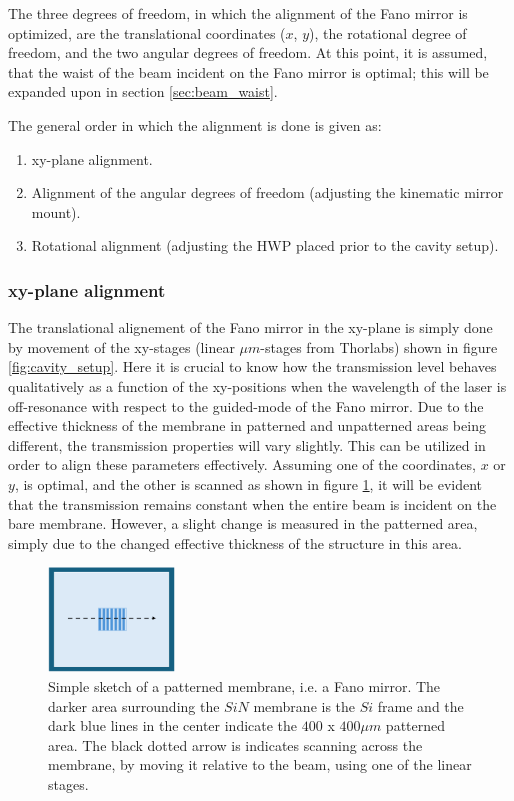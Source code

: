The three degrees of freedom, in which the alignment of the Fano mirror is optimized, are the translational coordinates ($x$, $y$), the rotational degree of freedom, and the two angular degrees of freedom. At this point, it is assumed, that the waist of the beam incident on the Fano mirror is optimal; this will be expanded upon in section \ref{sec:beam_waist}.

The general order in which the alignment is done is given as:
\begin{enumerate}
    \item xy-plane alignment. 
    \item Alignment of the angular degrees of freedom (adjusting the kinematic mirror mount).
    \item Rotational alignment (adjusting the HWP placed prior to the cavity setup).
\end{enumerate}

\subsubsection*{xy-plane alignment}
The translational alignement of the Fano mirror in the xy-plane is simply done by movement of the xy-stages (linear $\mu m$-stages from Thorlabs) shown in figure \ref{fig:cavity_setup}. Here it is crucial to know how the transmission level behaves qualitatively as a function of the xy-positions when the wavelength of the laser is off-resonance with respect to the guided-mode of the Fano mirror. Due to the effective thickness of the membrane in patterned and unpatterned areas being different, the transmission properties will vary slightly. This can be utilized in order to align these parameters effectively. Assuming one of the coordinates, $x$ or $y$, is optimal, and the other is scanned as shown in figure \ref{fig:xy_alignment_sketch}, it will be evident that the transmission remains constant when the entire beam is incident on the bare membrane. However, a slight change is measured in the patterned area, simply due to the changed effective thickness of the structure in this area. 

\begin{figure}[h!]
    \centering 
    \includegraphics[width=0.3\textwidth]{figures/xy_alignment_sketch.pdf}
    \caption{Simple sketch of a patterned membrane, i.e. a Fano mirror. The darker area surrounding the $SiN$ membrane is the $Si$ frame and the dark blue lines in the center indicate the $400$ x $400 \mu m$ patterned area. The black dotted arrow is indicates scanning across the membrane, by moving it relative to the beam, using one of the linear stages.}
    \label{fig:xy_alignment_sketch}
\end{figure}

